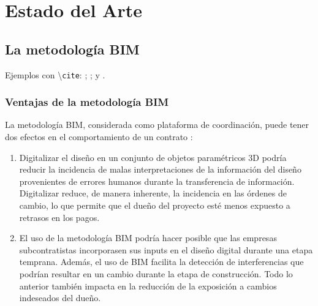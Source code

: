 \chapter{Estado del Arte}

\section{La metodología BIM}

Ejemplos con \textbackslash \texttt{cite}: ; \cite{lu2014cost};  y .


\subsection{Ventajas de la metodología BIM}

La metodología BIM, considerada como plataforma de coordinación, puede tener dos efectos en el comportamiento de un contrato \cite{chang2014economic}: 
\begin{enumerate}
    \item Digitalizar el diseño en un conjunto de objetos paramétricos 3D podría reducir la incidencia de malas interpretaciones de la información del diseño provenientes de errores humanos durante la transferencia de información. Digitalizar reduce, de manera inherente, la incidencia en las órdenes de cambio, lo que permite que el dueño del proyecto esté menos expuesto a retrasos en los pagos.
    \item El uso de la metodología BIM podría hacer posible que las empresas subcontratistas incorporasen sus inputs en el diseño digital durante una etapa temprana. Además, el uso de BIM facilita la detección de interferencias que podrían resultar en un cambio durante la etapa de construcción. Todo lo anterior también impacta en la reducción de la exposición a cambios indeseados del dueño.
\end{enumerate}
